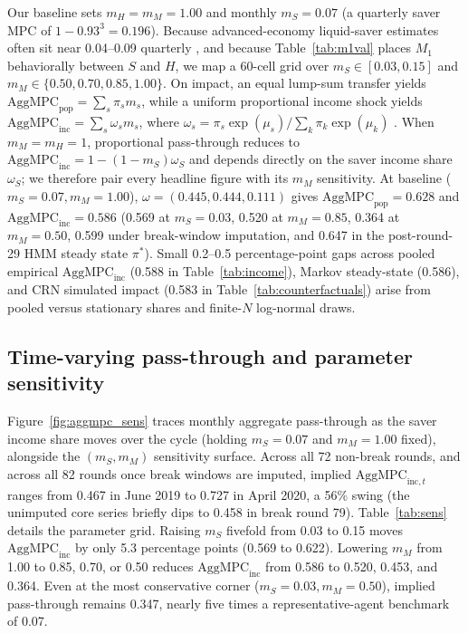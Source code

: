 \documentclass[11pt]{article}
\begin{document}
Our baseline sets $m_H = m_M = 1.00$ and monthly $m_S = 0.07$ (a quarterly saver MPC of $1 - 0.93^3 = 0.196$). Because advanced-economy liquid-saver estimates often sit near 0.04--0.09 quarterly \citep{kaplan2018monetary,fagereng2021mpc,kaplan2022mpc}, and because Table~\ref{tab:m1val} places $M_1$ behaviorally between $S$ and $H$, we map a 60-cell grid over $m_S \in [0.03, 0.15]$ and $m_M \in \{0.50, 0.70, 0.85, 1.00\}$. On impact, an equal lump-sum transfer yields $\text{AggMPC}_{\text{pop}} = \sum_s \pi_s m_s$, while a uniform proportional income shock yields $\text{AggMPC}_{\text{inc}} = \sum_s \omega_s m_s$, where $\omega_s = \pi_s \exp(\mu_s) / \sum_k \pi_k \exp(\mu_k)$ \citep{auclert2019monetary,patterson2023matching}. When $m_M = m_H = 1$, proportional pass-through reduces to $\text{AggMPC}_{\text{inc}} = 1 - (1 - m_S)\omega_S$ and depends directly on the saver income share $\omega_S$; we therefore pair every headline figure with its $m_M$ sensitivity. At baseline ($m_S = 0.07, m_M = 1.00$), $\omega = (0.445, 0.444, 0.111)$ gives $\text{AggMPC}_{\text{pop}} = 0.628$ and $\text{AggMPC}_{\text{inc}} = 0.586$ (0.569 at $m_S = 0.03$, 0.520 at $m_M = 0.85$, 0.364 at $m_M = 0.50$, 0.599 under break-window imputation, and 0.647 in the post-round-29 HMM steady state $\pi^*$). Small 0.2--0.5 percentage-point gaps across pooled empirical $\text{AggMPC}_{\text{inc}}$ (0.588 in Table~\ref{tab:income}), Markov steady-state (0.586), and CRN simulated impact (0.583 in Table~\ref{tab:counterfactuals}) arise from pooled versus stationary shares and finite-$N$ log-normal draws.

\subsection{Time-varying pass-through and parameter sensitivity}\label{sec:sens}

Figure~\ref{fig:aggmpc_sens} traces monthly aggregate pass-through as the saver income share moves over the cycle (holding $m_S = 0.07$ and $m_M = 1.00$ fixed), alongside the $(m_S, m_M)$ sensitivity surface. Across all 72 non-break rounds, and across all 82 rounds once break windows are imputed, implied $\text{AggMPC}_{\text{inc},t}$ ranges from 0.467 in June 2019 to 0.727 in April 2020, a 56\% swing (the unimputed core series briefly dips to 0.458 in break round 79). Table~\ref{tab:sens} details the parameter grid. Raising $m_S$ fivefold from 0.03 to 0.15 moves $\text{AggMPC}_{\text{inc}}$ by only 5.3 percentage points (0.569 to 0.622). Lowering $m_M$ from 1.00 to 0.85, 0.70, or 0.50 reduces $\text{AggMPC}_{\text{inc}}$ from 0.586 to 0.520, 0.453, and 0.364. Even at the most conservative corner ($m_S = 0.03, m_M = 0.50$), implied pass-through remains 0.347, nearly five times a representative-agent benchmark of 0.07.
\end{document}
